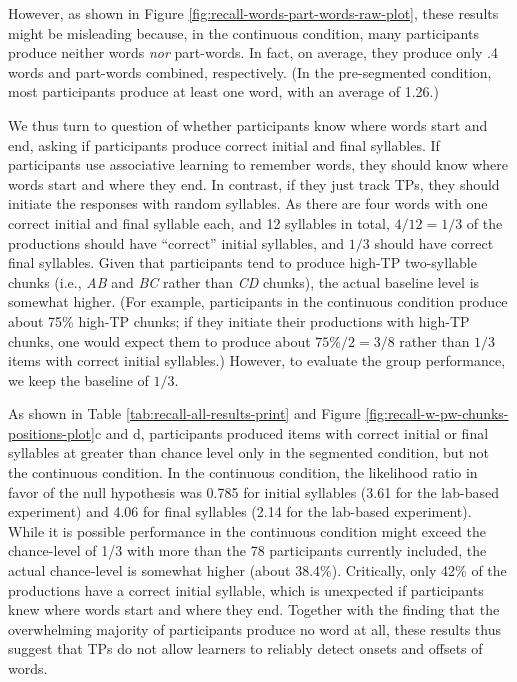 \documentclass[]{article}
\begin{document}
However, as shown in Figure \ref{fig:recall-words-part-words-raw-plot}, these results might be misleading because, in the continuous condition, many participants produce neither words \emph{nor} part-words. In fact, on average, they produce only .4 words and part-words combined, respectively. (In the pre-segmented condition, most participants produce at least one word, with an average of 1.26.) 



We thus turn to question of whether participants know where words start and end, asking if participants produce correct initial and final syllables. If participants use associative learning to remember words, they should know where words start and where they end. In contrast, if they just track TPs, they should initiate the responses with random syllables. As there are four words with one correct initial and final syllable each, and 12 syllables in total, $4/12 = 1/3$ of the productions should have ``correct'' initial syllables, and $1/3$ should have correct final syllables. Given that participants tend to produce high-TP two-syllable chunks (i.e., {\em AB} and {\em BC} rather than {\em CD} chunks), the actual baseline level is somewhat higher. (For example, participants in the continuous condition produce about 75\% high-TP chunks; if they initiate their productions with high-TP chunks, one would expect them to produce about $75\%/2 = 3/8$ rather than $1/3$ items with correct initial syllables.) However, to evaluate the group performance, we keep the baseline of $1/3$. 

As shown in Table \ref{tab:recall-all-results-print} and Figure \ref{fig:recall-w-pw-chunks-positions-plot}c and d, participants produced items with correct initial or final syllables at greater than chance level only in the segmented condition, but not the continuous condition. In the continuous condition, the likelihood ratio in favor of the null hypothesis was 0.785 for initial syllables (3.61 for the lab-based experiment) and 4.06 for final syllables (2.14 for the lab-based experiment). While it is possible performance in the continuous condition might exceed the chance-level of 1/3 with more than the 78 participants currently included, the actual chance-level is somewhat higher (about 38.4\%). Critically, only 42\% of the productions have a correct initial syllable, which is unexpected if participants knew where words start and where they end. Together with the finding that the overwhelming majority of participants produce no word at all, these results thus suggest that TPs do not allow learners to reliably detect onsets and offsets of words. 
\end{document}
